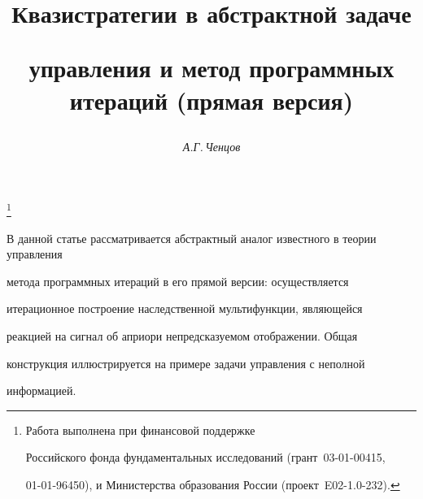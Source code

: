 












\author{\it А.Г.\,Ченцов}




\title{Квазистратегии в абстрактной задаче


управления и метод программных итераций (прямая версия)}


\thanks{Работа выполнена при финансовой поддержке


Российского фонда фундаментальных исследований (грант \No\,03-01-00415,


01-01-96450), и Министерства образования России (проект \No\,E02-1.0-232).}





\date{}




\pagestyle{plain} %







\maketitle


\label{begin}








В данной статье рассматривается абстрактный аналог известного в теории управления


метода программных итераций в его прямой версии: осуществляется


итерационное построение наследственной мультифункции, являющейся


реакцией на сигнал об априори непредсказуемом отображении. Общая


конструкция иллюстрируется на примере задачи управления с неполной


информацией.








